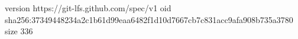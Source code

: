 version https://git-lfs.github.com/spec/v1
oid sha256:37349448234a2c1b61d99eaa6482f1d10d7667cb7c831acc9afa908b735a3780
size 336
